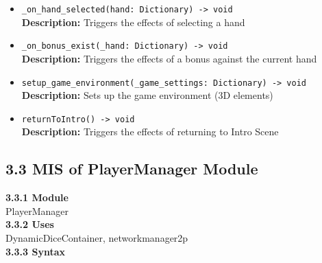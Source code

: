 \documentclass[12pt, titlepage]{article}
\begin{document}
\begin{itemize}
    \item \texttt{\_on\_hand\_selected(hand: Dictionary) -> void}\\
    \textbf{Description:} Triggers the effects of selecting a hand
    
    \item \texttt{\_on\_bonus\_exist(\_hand: Dictionary) -> void}\\
    \textbf{Description:} Triggers the effects of a bonus against the current hand
    
    \item \texttt{setup\_game\_environment(\_game\_settings: Dictionary) -> void}\\
    \textbf{Description:} Sets up the game environment (3D elements)
    
    \item \texttt{returnToIntro() -> void}\\
    \textbf{Description:} Triggers the effects of returning to Intro Scene
\end{itemize}

\subsection*{3.3 MIS of PlayerManager Module}
\textbf{3.3.1 Module}\\
 PlayerManager\\

\noindent \textbf{3.3.2 Uses}\\
DynamicDiceContainer,  networkmanager2p\\

\noindent \textbf{3.3.3 Syntax}
\end{document}
